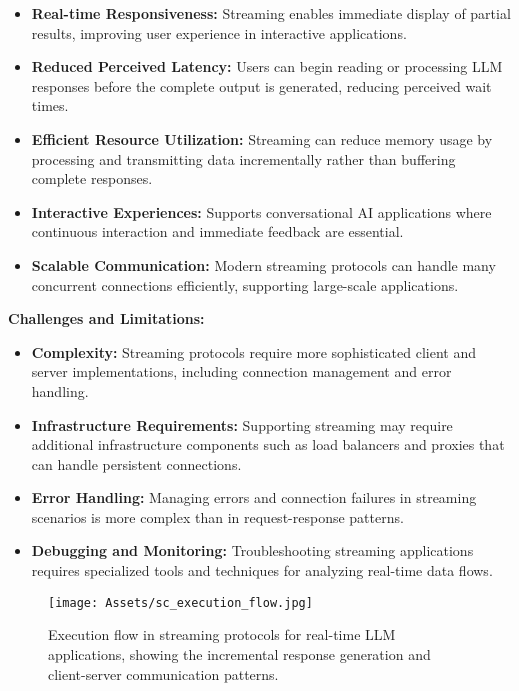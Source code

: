\begin{itemize}
    \item \textbf{Real-time Responsiveness:} Streaming enables immediate display of partial results, improving user experience in interactive applications.
    \item \textbf{Reduced Perceived Latency:} Users can begin reading or processing LLM responses before the complete output is generated, reducing perceived wait times.
    \item \textbf{Efficient Resource Utilization:} Streaming can reduce memory usage by processing and transmitting data incrementally rather than buffering complete responses.
    \item \textbf{Interactive Experiences:} Supports conversational AI applications where continuous interaction and immediate feedback are essential.
    \item \textbf{Scalable Communication:} Modern streaming protocols can handle many concurrent connections efficiently, supporting large-scale applications.
\end{itemize}

\textbf{Challenges and Limitations:}

\begin{itemize}
    \item \textbf{Complexity:} Streaming protocols require more sophisticated client and server implementations, including connection management and error handling.
    \item \textbf{Infrastructure Requirements:} Supporting streaming may require additional infrastructure components such as load balancers and proxies that can handle persistent connections.
    \item \textbf{Error Handling:} Managing errors and connection failures in streaming scenarios is more complex than in request-response patterns.
    \item \textbf{Debugging and Monitoring:} Troubleshooting streaming applications requires specialized tools and techniques for analyzing real-time data flows.
\end{itemize}

\begin{figure}[H]
    \centering
    \texttt{[image: Assets/sc\_execution\_flow.jpg]}
    \caption{Execution flow in streaming protocols for real-time LLM applications, showing the incremental response generation and client-server communication patterns.\cite{Jhisha2025}}
    \label{fig:streaming_protocols}
\end{figure}

